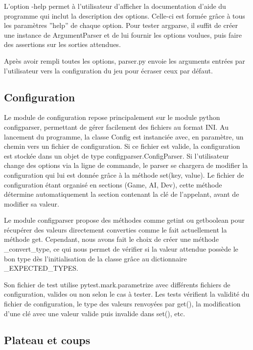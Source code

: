 \documentclass[12pt]{article}
\begin{document}
\bigskip
L'option -help permet à l'utilisateur d'afficher la documentation d'aide du programme qui inclut la description des options. Celle-ci est formée grâce à tous les paramètres ”help” de chaque option. Pour tester argparse, il suffit de créer une instance de ArgumentParser et de lui fournir les options voulues, puis faire des assertions sur les sorties attendues.

\bigskip
Après avoir rempli toutes les options, parser.py envoie les arguments entrées par l’utilisateur vers la configuration du jeu pour écraser ceux par défaut.

\subsection{Configuration} \label{impl-config}

Le module de configuration repose principalement sur le module python configparser, permettant de gérer facilement des fichiers au format INI. Au lancement du programme, la classe Config est instanciée avec, en paramètre, un chemin vers un fichier de configuration. Si ce fichier est valide, la configuration est stockée dans un objet de type configparser.ConfigParser. Si l’utilisateur change des options via la ligne de commande, le parser se chargera de modifier la configuration qui lui est donnée grâce à la méthode set(key, value). Le fichier de configuration étant organisé en sections (Game, AI, Dev), cette méthode détermine automatiquement la section contenant la clé de l’appelant, avant de modifier sa valeur.

\bigskip
Le module configparser propose des méthodes comme getint ou getboolean pour récupérer des valeurs directement converties comme le fait actuellement la méthode get. Cependant, nous avons fait le choix de créer une méthode \_convert\_type, ce qui nous permet de vérifier si la valeur attendue possède le bon type dès l’initialisation de la classe grâce au dictionnaire \_EXPECTED\_TYPES.

\bigskip
Son fichier de test utilise pytest.mark.parametrize avec différents fichiers de configuration, valides ou non selon le cas à tester. Les tests vérifient la validité du fichier de configuration, le type des valeurs renvoyées par get(), la modification d’une clé avec une valeur valide puis invalide dans set(), etc.

\subsection{Plateau et coups}
\end{document}

